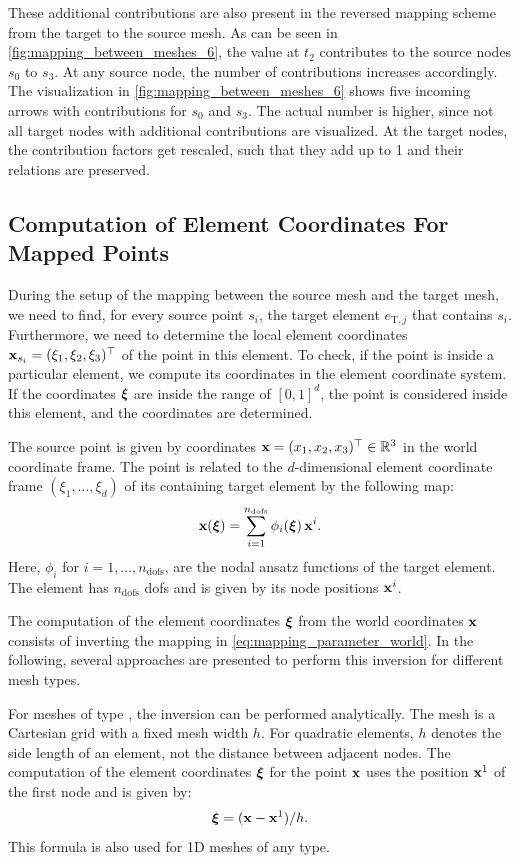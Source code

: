 These additional contributions are also present in the reversed mapping scheme from the target to the source mesh. As can be seen in \cref{fig:mapping_between_meshes_6}, the value at $t_2$ contributes to the source nodes $s_0$ to $s_3$. At any source node, the number of contributions increases accordingly. The visualization in \cref{fig:mapping_between_meshes_6} shows five incoming arrows with contributions for $s_0$ and $s_3$. The actual number is higher, since not all target nodes with additional contributions are visualized. At the target nodes, the contribution factors get rescaled, such that they add up to 1 and their relations are preserved.

\subsection{Computation of Element Coordinates For Mapped Points}

During the setup of the mapping between the source mesh and the target mesh, we need to find, for every source point $s_i$, the target element $e_{\text{T},j}$ that contains $s_i$. Furthermore, we need to determine the local element coordinates $\textbf{x}_{s_i} = (\xi_1,\xi_2,\xi_3)^\top$ of the point in this element. To check, if the point is inside a particular element, we compute its coordinates in the element coordinate system. If the coordinates $\boldsymbol{\xi}$ are inside the range of $[0,1]^d$, the point is considered inside this element, and the coordinates are determined.

The source point is given by coordinates $\textbf{x}=(x_1,x_2,x_3)^\top \in \mathbb{R}^3$ in the world coordinate frame. The point is related to the $d$-dimensional element coordinate frame $(\xi_1,\dots,\xi_d)$ of its containing target element by the following map:
\begin{align}\label{eq:mapping_parameter_world}
  \textbf{x}(\boldsymbol{\xi}) = \displaystyle\sum\limits_{i=1}^{n_\text{dofs}} \phi_i(\boldsymbol{\xi})\, \textbf{x}^i.
\end{align}
Here, $\phi_i$ for $i=1,\dots,n_\text{dofs}$, are the nodal ansatz functions of the target element. The element  has $n_\text{dofs}$ dofs and is given by its node positions $\textbf{x}^i$.

The computation of the element coordinates $\boldsymbol{\xi}$ from the world coordinates $\textbf{x}$ consists of inverting the mapping in \cref{eq:mapping_parameter_world}. In the following, several approaches are presented to perform this inversion for different mesh types.

For meshes of type , the inversion can be performed analytically. The mesh is a Cartesian grid with a fixed mesh width $h$. For quadratic elements, $h$ denotes the side length of an element, not the distance between adjacent nodes.
The computation of the element coordinates $\boldsymbol{\xi}$ for the point $\textbf{x}$ uses the position $\textbf{x}^1$ of the first node and is given by:
\begin{align*}
  \boldsymbol{\xi} = (\textbf{x} - \textbf{x}^1) / h.
\end{align*}
This formula is also used for 1D meshes of any type.

